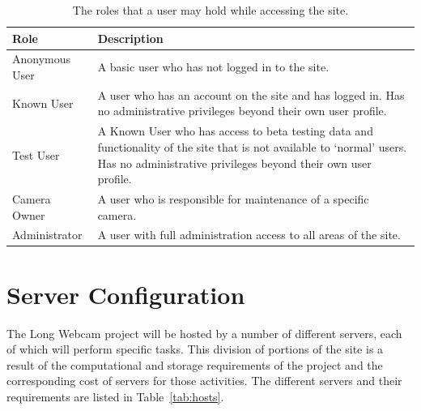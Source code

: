 \documentclass[11pt]{article}
\begin{document}
\begin{table}[h]
\begin{tabular}{ | p{1.45in} | p{4.45in} | }
\hline
\textbf{Role} & \textbf{Description} \\
\hline
Anonymous User & A basic user who has not logged in to the site. \\
\hline
Known User & A user who has an account on the site and has logged in. Has no administrative privileges beyond their own user profile. \\
\hline
Test User & A Known User who has access to beta testing data and functionality of the site that is not available to `normal' users. Has no administrative privileges beyond their own user profile. \\
\hline
Camera Owner & A user who is responsible for maintenance of a specific camera. \\
\hline
Administrator & A user with full administration access to all areas of the site. \\
\hline
\end{tabular}
\caption{The roles that a user may hold while accessing the site.}
\label{tab:roles}
\end{table}

\section{Server Configuration}
The Long Webcam project will be hosted by a number of different servers, each of which will perform specific tasks. This division of portions of the site is a result of the computational and storage requirements of the project and the corresponding cost of servers for those activities. The different servers and their requirements are listed in Table~\ref{tab:hosts}.
\end{document}
